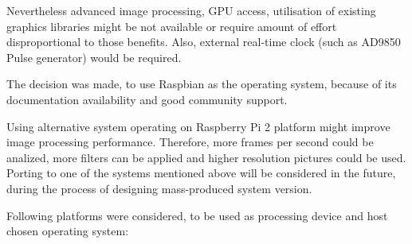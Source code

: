\documentclass[12pt,twoside,a4paper]{article}
\begin{document}
Nevertheless advanced image processing, GPU access, utilisation of existing graphics libraries might be not available or require amount of effort disproportional to those benefits.
Also, external real-time clock (such as AD9850 Pulse generator) would be required.

The decision was made, to use Raspbian as the operating system, because of its documentation availability and good community support.

Using alternative system operating on Raspberry Pi 2 platform might improve image processing performance. Therefore, more frames per second could be analized, more filters can be applied and higher resolution pictures could be used.
Porting to one of the systems mentioned above will be considered in the future, during the process of designing mass-produced system version.

Following platforms were considered, to be used as processing device and host chosen operating system:
\end{document}
